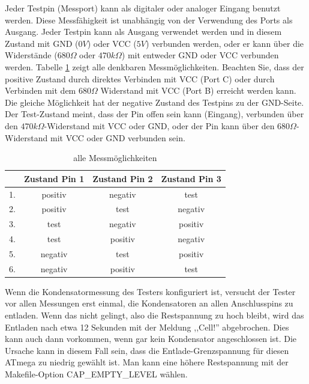 Jeder Testpin (Messport) kann als digitaler oder analoger Eingang benutzt werden.
Diese Mess\-fähig\-keit ist un\-abhän\-gig von der Verwendung des Ports als Ausgang.
Jeder Testpin kann als Ausgang verwendet werden und in diesem Zustand mit GND (\(0V\)) oder VCC (\(5V\)) verbunden werden,
oder er kann über die Widerstände (\(680\Omega\) oder \(470k\Omega\)) mit entweder GND oder VCC verbunden werden.
Tabelle \ref{tab:case} zeigt alle denkbaren Messmöglichkeiten.
Beachten Sie, dass der positive Zustand durch direktes Verbinden mit VCC (Port C) oder
durch Verbinden mit dem \(680\Omega\) Widerstand mit VCC (Port B) erreicht werden kann.
Die gleiche Möglichkeit hat der negative Zustand des Testpins zu der GND-Seite.
Der Test-Zustand meint, dass der Pin offen sein kann (Eingang), verbunden über den \(470k\Omega\)-Widerstand
mit VCC oder GND, oder der Pin kann über den \(680\Omega\)-Widerstand mit VCC oder GND verbunden sein.

\begin{table}[H]
  \begin{center}
    \begin{tabular}{| l | c | c | c |}
    \hline
      & Zustand Pin 1 & Zustand Pin 2 & Zustand Pin 3 \\
    \hline
   1. & positiv    &  negativ   &  test \\
   2. & positiv    &  test      & negativ \\
   3. & test       &  negativ   & positiv \\
   4. & test       &  positiv   & negativ \\
   5. & negativ    &  test      & positiv \\
   6. & negativ    &  positiv   &  test  \\
    \hline
    \end{tabular}
  \end{center}
  \caption{alle Messmöglichkeiten}
  \label{tab:case} 
\end{table}

Wenn die Kondensatormessung des Testers konfiguriert ist, versucht der Tester vor allen Messungen erst einmal,
die Kondensatoren an allen Anschlusspins zu entladen. Wenn das nicht gelingt, also die Restspannung zu hoch bleibt,
wird das Entladen nach etwa 12 Sekunden mit der Meldung ,,Cell!'' abgebrochen. Dies kann auch dann vorkommen, wenn
gar kein Kondensator angeschlossen ist. Die Ursache kann in diesem Fall sein, dass die Entlade-Grenzspannung für diesen
ATmega zu niedrig gewählt ist. Man kann eine höhere Restspannung mit der Makefile-Option CAP\_EMPTY\_LEVEL wählen.
